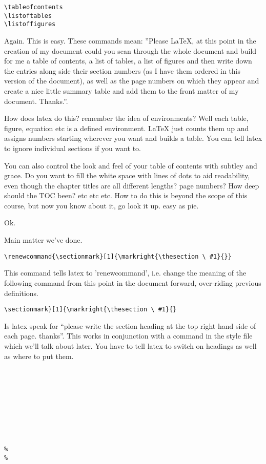 \begin{verbatim}
\tableofcontents
\listoftables
\listoffigures
\end{verbatim}

Again. This is easy. These commands mean: ''Please LaTeX, at this point in the creation of my document could you scan through the whole document and build for me a table of contents, a list of tables, a list of figures and then write down the entries along side their section numbers (as I have them ordered in this version of the document), as well as the page numbers on which they appear and create a nice little summary table and add them to the front matter of my document. Thanks.''.

How does latex do this?  remember the idea of environments?  Well each table, figure, equation etc is a defined environment.  LaTeX just counts them up and assigns numbers starting wherever you want and builds a table.  You can tell latex to ignore individual sections if you want to.

You can also control the look and feel of your table of contents with subtley and grace. Do you want to fill the white space with lines of dots to aid readability, even though the chapter titles are all different lengths? page numbers? How deep should the TOC been?  etc etc etc. How to do this is beyond the scope of this course, but now you know about it, go look it up. easy as pie.

Ok.

Main matter we've done.

\begin{verbatim}
\renewcommand{\sectionmark}[1]{\markright{\thesection \ #1}{}}
\end{verbatim}

This command tells latex to 'renewcommand', i.e. change the meaning of the following command from this point in the document forward, over-riding previous definitions.
\begin{verbatim}
\sectionmark}[1]{\markright{\thesection \ #1}{}
\end{verbatim}

Is latex speak for ``please write the section heading at the top right hand side of each page. thanks''. This works in conjunction with a command in the style file which we'll talk about later. You have to tell latex to switch on headings as well as where to put them.

\begin{verbatim}









%
%
\end{verbatim}

